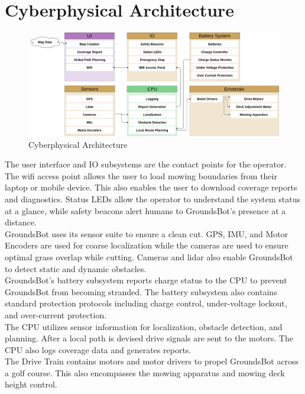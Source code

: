 \documentclass{article}
\begin{document}
\section{Cyberphysical Architecture}
\begin{figure}[H]
\includegraphics[scale=0.2]{cyberphysical.png}
\caption{Cyberphysical Architecture}
\label{fig:cyberphysical}
\end{figure}

  The user interface and IO subsystems are the contact points for the operator.  The wifi access point allows the user to load mowing boundaries from their laptop or mobile device.  This also enables the user to download coverage reports and diagnostics.  Status LEDs allow the operator to understand the system status at a glance, while safety beacons alert humans to GroundsBot's presence at a distance.\\

  GroundsBot uses its sensor suite to ensure a clean cut. GPS, IMU, and Motor Encoders are used for coarse localization while the cameras are used to ensure optimal grass overlap while cutting.  Cameras and lidar also enable GroundsBot to detect static and dynamic obstacles.\\

  GroundsBot's battery subsystem reports charge status to the CPU to prevent GroundsBot from becoming stranded. The battery subsystem also contains standard protection protocols including charge control, under-voltage lockout, and over-current protection. \\

  The CPU utilizes sensor information for localization, obstacle detection, and planning.  After a local path is devised drive signals are sent to the motors. The CPU also logs coverage data and generates reports.\\

  The Drive Train contains motors and motor drivers to propel GroundsBot across a golf course.  This also encompasses the mowing apparatus and mowing deck height control. \\
\end{document}
